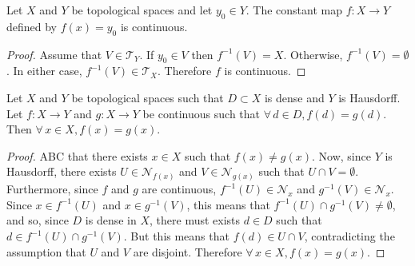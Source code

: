 \documentclass[letterpaper,12pt,fleqn]{article}
\newcommand{\T}{\mathscr{T}}
\renewcommand{\N}{\mathcal{N}}
\begin{document}
\begin{theorem}[7.2]
  Let \(X\) and \(Y\) be topological spaces and let \(y_0\in Y\).  The constant map \(f:X\to Y\) defined by
  \(f(x)=y_0\) is continuous.
\end{theorem}

\begin{proof}
  Assume that \(V\in\T_Y\).  If \(y_0\in V\) then \(f^{-1}(V)=X\).  Otherwise, \(f^{-1}(V)=\emptyset\).  In either
  case, \(f^{-1}(V)\in\T_X\).  Therefore \(f\) is continuous.
\end{proof}

\begin{theorem}[7.7]
  Let \(X\) and \(Y\) be topological spaces such that \(D\subset X\) is dense and \(Y\) is Hausdorff.  Let
  \(f:X\to Y\) and \(g:X\to Y\) be continuous such that \(\forall\,d\in D,f(d)=g(d)\).  Then
  \(\forall\,x\in X, f(x)=g(x)\).
\end{theorem}

\begin{proof}
  ABC that there exists \(x\in X\) such that \(f(x)\ne g(x)\).  Now, since \(Y\) is Hausdorff, there exists
  \(U\in\N_{f(x)}\) and \(V\in\N_{g(x)}\) such that \(U\cap V=\emptyset\).  Furthermore, since \(f\) and \(g\) are
  continuous, \(f^{-1}(U)\in\N_x\) and \(g^{-1}(V)\in\N_x\).  Since \(x\in f^{-1}(U)\) and \(x\in g^{-1}(V)\), this
  means that \(f^{-1}(U)\cap g^{-1}(V)\ne\emptyset\), and so, since \(D\) is dense in \(X\), there must exists
  \(d\in D\) such that \(d\in f^{-1}(U)\cap g^{-1}(V)\).  But this means that \(f(d)\in U\cap V\), contradicting
  the assumption that \(U\) and \(V\) are disjoint.  Therefore \(\forall\,x\in X,f(x)=g(x)\).
\end{proof}
\end{document}
